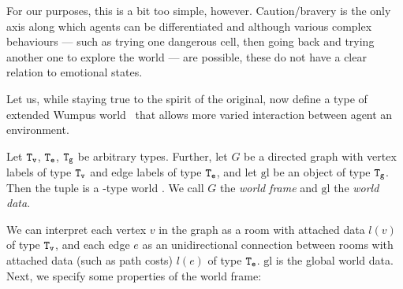 For our purposes, this is a bit too simple, however. Caution/bravery is the only axis along which agents can be differentiated and although various complex behaviours --- such as trying one dangerous cell, then going back and trying another one to explore the world --- are possible, these do not have a clear relation to emotional states.

Let us, while staying true to the spirit of the original, now define a type of extended Wumpus world \wext\ that allows more varied interaction between agent an environment.

\begin{definition}\label{def:wext}
	Let $\mathtt{T_v}$, $\mathtt{T_e}$, $\mathtt{T_g}$ be arbitrary types. Further, let $G$ be a directed graph with vertex labels of type $\mathtt{T_v}$ and edge labels of type $\mathtt{T_e}$, and let $\mathrm{gl}$ be an object of type $\mathtt{T_g}$. Then the tuple  is a \wext-type world . We call $G$ the {\em world frame} and $\mathrm{gl}$ the {\em world data}.
\end{definition}

We can interpret each vertex $v$ in the graph as a room with attached data $l(v)$ of type $\mathtt{T_v}$, and each edge $e$ as an unidirectional connection between rooms with attached data (such as path costs) $l(e)$ of type $\mathtt{T_e}$. $\mathrm{gl}$ is the global world data. Next, we specify some properties of the world frame:

